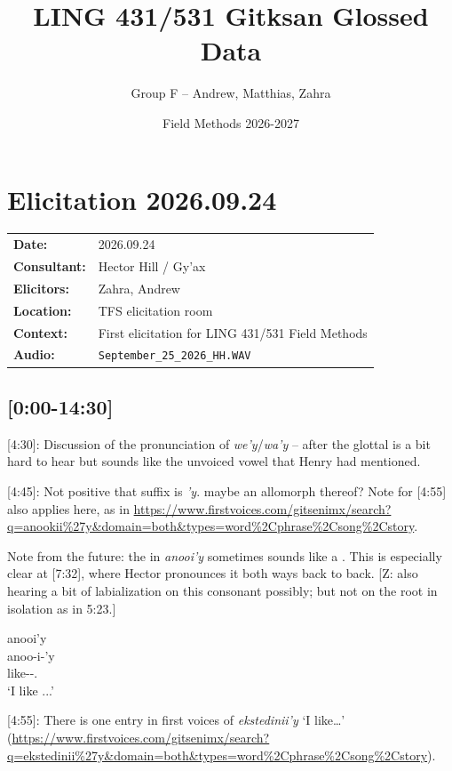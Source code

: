 \documentclass{article}
\title{LING 431/531 Gitksan Glossed Data}
\author{Group F -- Andrew, Matthias, Zahra}
\date{Field Methods 2026-2027}
\newcommand{\tsb}{\textsubbar} %
\begin{document}
\maketitle

\section{Elicitation 2026.09.24}

\begin{tabular}{ll}
\textbf{Date:} & 2026.09.24 \\
\textbf{Consultant:} & Hector Hill / Gy'ax \\
\textbf{Elicitors:} & Zahra, Andrew \\
\textbf{Location:} & TFS elicitation room \\
\textbf{Context:} & First elicitation for LING 431/531 Field Methods \\
\textbf{Audio:} & \texttt{September\_25\_2026\_HH.WAV} \\
\end{tabular}

\subsection{[0:00-14:30]}

[4:30]: Discussion of the pronunciation of \textit{we'y}/\textit{wa'y} -- after the glottal is a bit hard to hear but sounds like the unvoiced vowel that Henry had mentioned. 

[4:45]: Not positive that suffix is \textit{'y}. maybe an allomorph thereof? Note for [4:55] also applies here, as in \url{https://www.firstvoices.com/gitsenimx/search?q=anookii%27y&domain=both&types=word%2Cphrase%2Csong%2Cstory}.

Note from the future: the \textit{\tsb{g}} in \textit{anoo\tsb{g}i'y} sometimes sounds like a \textit{\tsb{x}}. This is especially clear at [7:32], where Hector pronounces it both ways back to back. [Z: also hearing a bit of labialization on this consonant possibly; but not on the root in isolation as in 5:23.] 

\begin{exe}
    \ex \glll anoo\tsb{g}i'y \\
    anoo\tsb{k}-i-'y \\
    like-\Tr{}-\Fsg.\Ii{} \\
    `I like ...'
\end{exe}

[4:55]: There is one entry in first voices of \textit{ekstedinii'y} `I like\dots' (\url{https://www.firstvoices.com/gitsenimx/search?q=ekstedinii%27y&domain=both&types=word%2Cphrase%2Csong%2Cstory}). 
\end{document}
